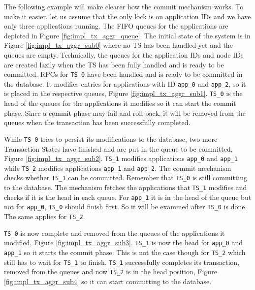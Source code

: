 The following example will make clearer how the commit mechanism works.
To make it easier, let us assume that the only lock is on
application IDs and we have only three applications running. The FIFO
queues for the applications are depicted in Figure
\ref{fig:impl_tx_aggr_queue}. The initial state of the system is in
Figure \ref{fig:impl_tx_aggr_sub0} where no TS has been handled yet
and the queues are empty. Technically, the queues for the application
IDs and node IDs are created lazily when the TS has been fully handled
and is ready to be committed. RPCs for \texttt{TS\_0} have been
handled and is ready to be committed in the database. It modifies
entries for applications with ID \texttt{app\_0} and \texttt{app\_2},
so it is placed in the respective queues, Figure
\ref{fig:impl_tx_aggr_sub1}. \texttt{TS\_0} is the head
of the queues for the applications it modifies so it can start the
commit phase. Since a commit phase may fail and roll-back, it will be
removed from the queues when the transaction has been successfully
completed.

While \texttt{TS\_0} tries to persist its modifications to the
database, two more Transaction States have finished and are put in the
queue to be committed, Figure
\ref{fig:impl_tx_aggr_sub2}. \texttt{TS\_1} modifies applications
\texttt{app\_0} and \texttt{app\_1} while \texttt{TS\_2} modifies
applications \texttt{app\_1} and \texttt{app\_2}. The commit mechanism
checks whether \texttt{TS\_1} can be committed. Remember that
\texttt{TS\_0} is still committing to the database. The mechanism
fetches the applications that \texttt{TS\_1} modifies and checks if it
is the head in each queue. For \texttt{app\_1} it is in the head of
the queue but not for \texttt{app\_0}, \texttt{TS\_0} should finish
first. So it will be examined after \texttt{TS\_0} is done. The same
applies for \texttt{TS\_2}.

\texttt{TS\_0} is now complete and removed from the queues of the
applications it modified, Figure
\ref{fig:impl_tx_aggr_sub3}. \texttt{TS\_1} is now the head for
\texttt{app\_0} and \texttt{app\_1} so it starts the commit
phase. This is not the case though for \texttt{TS\_2} which still has
to wait for \texttt{TS\_1} to finish. \texttt{TS\_1} successfully
completes its transaction, removed from the queues and now
\texttt{TS\_2} is in the head position, Figure
\ref{fig:impl_tx_aggr_sub4} so it can start committing to the database.

